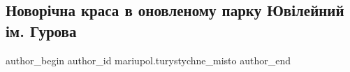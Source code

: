  
 
 
 
 

\subsection{Новорічна краса в оновленому парку Ювілейний ім. Гурова}
\label{sec:24_12_2021.fb.mariupol.turystychne_misto.1.novorichna_krasa_park_gurova}

\ifcmt
 author_begin
   author_id mariupol.turystychne_misto
 author_end
\fi

